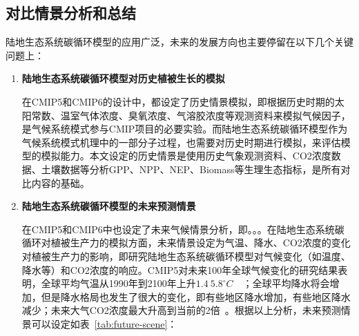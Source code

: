 \subsection{对比情景分析和总结}
\label{sec:scene}
陆地生态系统碳循环模型的应用广泛，未来的发展方向也主要停留在以下几个关键问题上：
\begin{enumerate}[(1)]
\item \textbf{陆地生态系统碳循环模型对历史植被生长的模拟}

在CMIP5和CMIP6的设计中，都设定了历史情景模拟，即根据历史时期的太阳常数、温室气体浓度、臭氧浓度、气溶胶浓度等观测资料来模拟气候因子，是气候系统模式参与CMIP项目的必要实验。而陆地生态系统碳循环模型作为气候系统模式机理中的一部分子过程，也需要对历史时期进行模拟，来评估模型的模拟能力。本文设定的历史情景是使用历史气象观测资料、CO2浓度数据、土壤数据等分析GPP、NPP、NEP、Biomass等生理生态指标，是所有对比内容的基础。

\item \textbf{陆地生态系统碳循环模型的未来预测情景}

在CMIP5和CMIP6中也设定了未来气候情景分析，即。。。在陆地生态系统碳循环对植被生产力的模拟方面，未来情景设定为气温、降水、CO2浓度的变化对植被生产力的影响，即研究陆地生态系统碳循环模型对气候变化（如温度、降水等）和CO2浓度的响应。CMIP5对未来100年全球气候变化的研究结果表明，全球平均气温从1990年到2100年上升$1.4~5.8^{\circ}C$~\cite{王绍武1995未来}~\cite{秦大河2003气候变化的事实与影响及对策}；全球平均降水将会增加，但是降水格局也发生了很大的变化，即有些地区降水增加，有些地区降水减少；未来大气CO2浓度最大升高到当前的2倍~\cite{griggs2002climate}。根据以上分析，未来预测情景可以设定如表~\ref{tab:future-scene}：


\end{enumerate}
